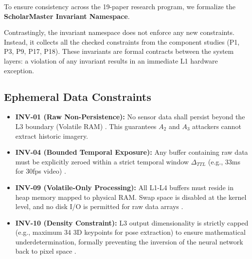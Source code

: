 \documentclass[conference]{IEEEtran}
\theoremstyle{definition}
\begin{document}
To ensure consistency across the 19-paper research program, we formalize the \textbf{ScholarMaster Invariant Namespace}. 



Contrastingly, the invariant namespace does not enforce any new constraints. Instead, it collects all the checked constraints from the component studies (P1, P3, P9, P17, P18). These invariants are formal contracts between the system layers: a violation of any invariant results in an immediate L1 hardware exception.

\subsection{Ephemeral Data Constraints}
\begin{itemize}
    \item \textbf{INV-01 (Raw Non-Persistence):} No sensor data shall persist beyond the L3 boundary (Volatile RAM) \cite{P17, P18}. This guarantees $A_2$ and $A_3$ attackers cannot extract historic imagery.
    \item \textbf{INV-04 (Bounded Temporal Exposure):} Any buffer containing raw data must be explicitly zeroed within a strict temporal window $\Delta_{TTL}$ (e.g., 33ms for 30fps video) \cite{P19}. 
    \item \textbf{INV-09 (Volatile-Only Processing):} All L1-L4 buffers must reside in heap memory mapped to physical RAM. Swap space is disabled at the kernel level, and no disk I/O is permitted for raw data arrays \cite{P12}.
    \item \textbf{INV-10 (Density Constraint):} L3 output dimensionality is strictly capped (e.g., maximum 34 3D keypoints for pose extraction) to ensure mathematical underdetermination, formally preventing the inversion of the neural network back to pixel space \cite{P3}.
\end{itemize}
\end{document}
